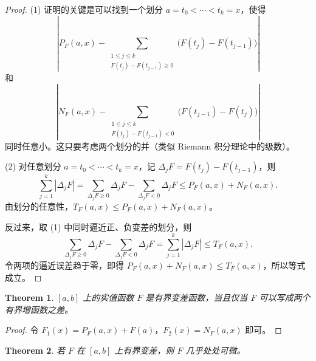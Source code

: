 \documentclass[12pt,letterpaper,twoside,openright]{ctexbook}
\theoremstyle{bluehead}
\newtheorem{theorem}{Theorem}
\theoremstyle{olivehead}
\theoremstyle{orangehead}
\theoremstyle{redremark}
\begin{document}
\begin{proof}
(1) 证明的关键是可以找到一个划分 $a=t_0<\cdots<t_k=x$，使得
\[
\left|P_F(a,x)-\sum_{\substack{1\leq j\leq k\\F(t_j)-F(t_{j-1})\geq0}}\bigl(F(t_j)-F(t_{j-1})\bigr)\right|
\]
和
\[
\left|N_F(a,x)-\sum_{\substack{1\leq j\leq k\\F(t_j)-F(t_{j-1})<0}}\bigl(F(t_{j-1})-F(t_j)\bigr)\right|
\]
同时任意小。这只要考虑两个划分的并（类似 Riemann 积分理论中的级数）。

(2) 对任意划分 $a=t_0<\cdots<t_k=x$，记 $\Delta_jF=F(t_j)-F(t_{j-1})$，则
\[
\sum_{j=1}^k|\Delta_jF|
=\sum_{\Delta_jF\geq0}\Delta_jF-\sum_{\Delta_jF<0}\Delta_jF
\leq P_F(a,x)+N_F(a,x).
\]
由划分的任意性，$T_F(a,x)\leq P_F(a,x)+N_F(a,x)$。

反过来，取 (1) 中同时逼近正、负变差的划分，则
\[
\sum_{\Delta_jF\geq0}\Delta_jF-\sum_{\Delta_jF<0}\Delta_jF
=\sum_{j=1}^k|\Delta_jF|\leq T_F(a,x).
\]
令两项的逼近误差趋于零，即得 $P_F(a,x)+N_F(a,x)\leq T_F(a,x)$，所以等式成立。
\end{proof}
\begin{theorem}\label{thm:bv-difference-increasing}
$[a,b]$ 上的实值函数 $F$ 是有界变差函数，当且仅当 $F$ 可以写成两个有界增函数之差。
\end{theorem}
\begin{proof}
令 $F_1(x)=P_F(a,x)+F(a)$，$F_2(x)=N_F(a,x)$ 即可。
\end{proof}
\begin{theorem}\label{thm:bv-differentiable-ae}
若 $F$ 在 $[a,b]$ 上有界变差，则 $F$ 几乎处处可微。
\end{theorem}
\end{document}
